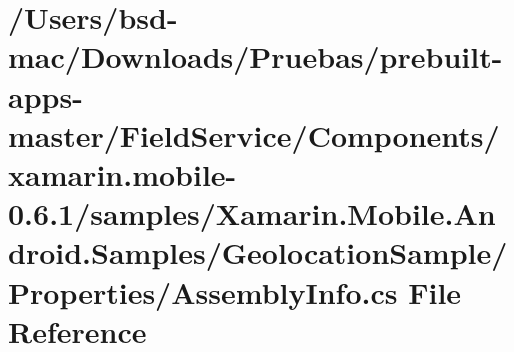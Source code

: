 \hypertarget{_components_2xamarin_8mobile-0_86_81_2samples_2_xamarin_8_mobile_8_android_8_samples_2_geolocati66e83dd81b006dd72b261cae0d46c0ff}{\section{/\+Users/bsd-\/mac/\+Downloads/\+Pruebas/prebuilt-\/apps-\/master/\+Field\+Service/\+Components/xamarin.mobile-\/0.6.1/samples/\+Xamarin.Mobile.\+Android.\+Samples/\+Geolocation\+Sample/\+Properties/\+Assembly\+Info.cs File Reference}
\label{_components_2xamarin_8mobile-0_86_81_2samples_2_xamarin_8_mobile_8_android_8_samples_2_geolocati66e83dd81b006dd72b261cae0d46c0ff}
}
